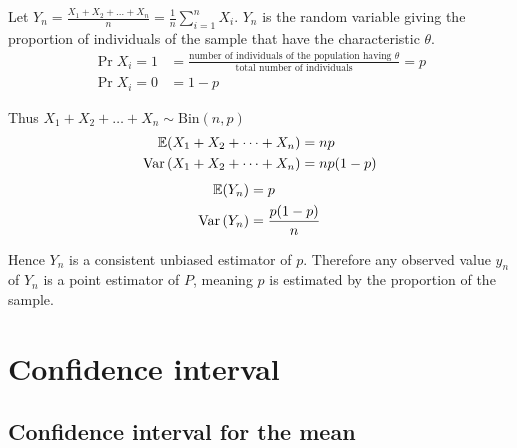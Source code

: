 \documentclass{report}
\begin{document}
Let $Y_n=\frac{X_1+X_2+\dots+X_n}{n}=\frac{1}{n}\sum_{i=1}^nX_i$. $Y_n$ is the random variable giving the proportion of individuals of the sample that have the characteristic $\theta$.
\begin{align*}
	\Pr{X_i=1} & =\frac{\text{number of individuals of the population having }\theta}{\text{total number of individuals}} = p \\
	\Pr{X_i=0} & =1-p
\end{align*}

Thus $X_1+X_2+\dots+X_n\sim\mathrm{Bin}(n,p)$
\begin{align*}
	\mathbb{E}(X_1+X_2+\dots+X_n)  & = np      \\
	\mathrm{Var}\left( X_1+X_2+\dots+X_n \right) & = np(1-p)
\end{align*}
\begin{align*}
	\mathbb{E}(Y_n)  & = p                \\
	\mathrm{Var}\left( Y_n \right) & = \frac{p(1-p)}{n}
\end{align*}

Hence $Y_n$ is a consistent unbiased estimator of $p$. Therefore any observed value $y_n$ of $Y_n$ is a point estimator of $P$, meaning $p$ is estimated by the proportion of the sample.

\section{Confidence interval}

\subsection{Confidence interval for the mean}
\end{document}
